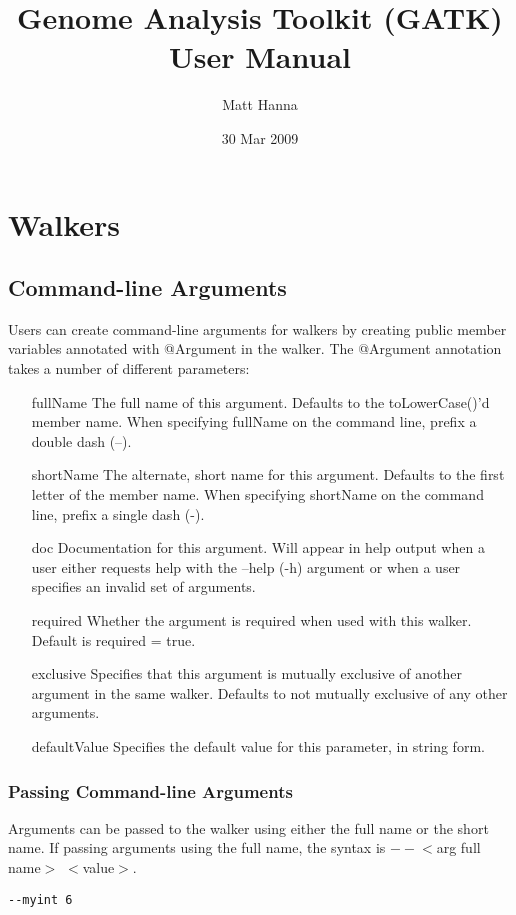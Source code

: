 \documentclass[11pt,fullpage]{article}
\begin{document}
\title{Genome Analysis Toolkit (GATK) User Manual}
\author{Matt Hanna}
\date{30 Mar 2009}
\maketitle

\section{Walkers}
\subsection{Command-line Arguments}
Users can create command-line arguments for walkers by creating public
member variables annotated with @Argument in the walker.  The
@Argument annotation takes a number of different parameters:

\begin{enumerate}
  \item [fullName] The full name of this argument.  Defaults to the
    toLowerCase()'d member name.  When specifying fullName on the 
    command line, prefix a double dash (--).
  \item [shortName] The alternate, short name for this argument.
    Defaults to the first letter of the member name.  When specifying 
    shortName on the command line, prefix a single dash (-).
  \item [doc] Documentation for this argument.  Will appear in help
    output when a user either requests help with the --help (-h)
    argument or when a user specifies an invalid set of arguments.
  \item [required] Whether the argument is required when used with
    this walker.  Default is required = true.
  \item [exclusive] Specifies that this argument is mutually
    exclusive of another argument in the same walker.  Defaults to not
    mutually exclusive of any other arguments.
  \item [defaultValue] Specifies the default value for this parameter,
    in string form.  
\end{enumerate}

\subsubsection{Passing Command-line Arguments}
Arguments can be passed to the walker using either the full name or
the short name.  If passing arguments using the full name, the syntax
is $--$$<$arg full name$>$ $<$value$>$.
\begin{verbatim}
--myint 6
\end{verbatim}
\end{document}
